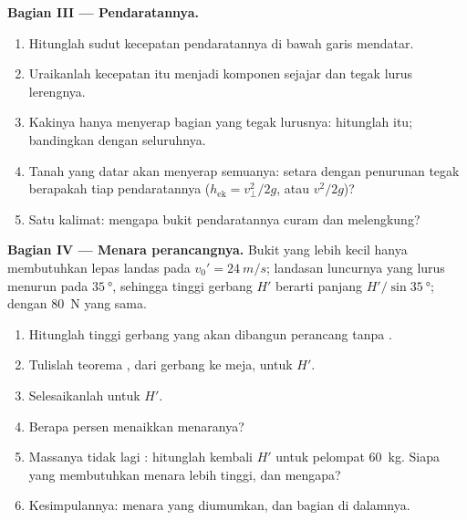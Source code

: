 \begin{problem}
\medskip\noindent\textbf{Bagian III --- Pendaratannya.}
\begin{enumerate}[resume]
  \item Hitunglah sudut kecepatan pendaratannya di bawah garis mendatar.
  \item Uraikanlah kecepatan itu menjadi komponen sejajar dan tegak lurus
        lerengnya.
  \item Kakinya hanya menyerap bagian yang tegak lurusnya: hitunglah
         itu; bandingkan dengan  seluruhnya.
  \item Tanah yang datar akan menyerap semuanya: setara dengan penurunan tegak
        berapakah tiap pendaratannya ($h_{\text{ek}} = v_\perp^2/2g$,
        atau $v^2/2g$)?
  \item Satu kalimat: mengapa bukit pendaratannya curam dan melengkung?
\end{enumerate}

\medskip\noindent\textbf{Bagian IV --- Menara perancangnya.}
Bukit yang lebih kecil hanya membutuhkan lepas landas pada $v_0' = \qty{24}{m/s}$;
landasan luncurnya yang lurus menurun pada $\qty{35}{\degree}$, sehingga tinggi gerbang $H'$
berarti panjang  $H'/\sin\qty{35}{\degree}$; dengan  \qty{80}{N} yang sama.
\begin{enumerate}[resume]
  \item Hitunglah tinggi gerbang yang akan dibangun perancang tanpa .
  \item Tulislah teorema , dari gerbang ke meja, untuk $H'$.
  \item Selesaikanlah untuk $H'$.
  \item Berapa persen  menaikkan menaranya?
  \item Massanya tidak lagi : hitunglah kembali $H'$ untuk pelompat
        \qty{60}{kg}. Siapa yang membutuhkan menara lebih tinggi, dan mengapa?
  \item Kesimpulannya: menara yang diumumkan, dan bagian  di dalamnya.
\end{enumerate}
\end{problem}
